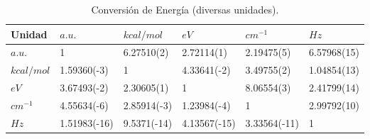 \begin{table}[ht]
  \myfloatalign
  \footnotesize
  \begin{tabularx}{\textwidth}{XXXXXX} \toprule
   Unidad      & $a.u.$ & $kcal/mol$  & $eV$        & $cm^{-1}$    & $Hz$        \\ \midrule%
    $a.u.$     & 1      & 6.27510(2) & 2.72114(1) & 2.19475(5) & 6.57968(15) \\ \midrule%
    $kcal/mol$ & 1.59360(-3) & 1     & 4.33641(-2)& 3.49755(2) & 1.04854(13) \\ \midrule%
    $eV$       & 3.67493(-2) & 2.30605(1) & 1     & 8.06554(3) & 2.41799(14) \\ \midrule%
    $cm^{-1}$   & 4.55634(-6) & 2.85914(-3) & 1.23984(-4) & 1   & 2.99792(10) \\ \midrule%
    $Hz$       & 1.51983(-16)& 9.5371(-14) & 4.13567(-15) & 3.33564(-11) & 1  \\ %
    \bottomrule
  \end{tabularx}%
  \caption{Conversión de Energía (diversas unidades).}
  \label{tab:AU-SI}
\end{table}











